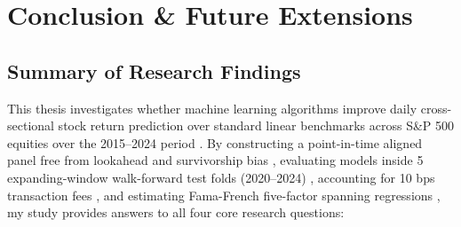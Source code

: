 \chapter{Conclusion \& Future Extensions}
\label{ch:conclusion}

\section{Summary of Research Findings}
This thesis investigates whether machine learning algorithms improve daily cross-sectional stock return prediction over standard linear benchmarks across S\&P 500 equities over the 2015--2024 period \citep{gu2020empirical, chen2023deep}. By constructing a point-in-time aligned panel free from lookahead and survivorship bias \citep{mclean2016does}, evaluating models inside 5 expanding-window walk-forward test folds (2020--2024) \citep{lopez2018advances}, accounting for 10 bps transaction fees \citep{novy2016taxonomy}, and estimating Fama-French five-factor spanning regressions \citep{fama2015five, carhart1997on}, my study provides answers to all four core research questions:

